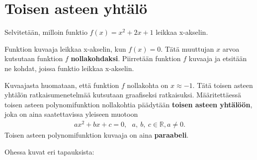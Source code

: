 \chapter{Toisen asteen yhtälö}
\begin{esimerkki}
Selvitetään, milloin funktio $f(x)=x^2+2x+1$ leikkaa x-akselin.

Funktion kuvaaja leikkaa x-akselin, kun $f(x)=0$. Tätä muuttujan $x$ arvoa kutsutaan funktion $f$ \textbf{nollakohdaksi}. Piirretään funktion $f$ kuvaaja ja etsitään ne kohdat, joissa funktio leikkaa x-akselin. %

\begin{kuvaajapohja}{1.5}{-2.5}{0.5}{-0.5}{3}
\end{kuvaajapohja}

\end{esimerkki}

Kuvaajasta huomataan, että funktion $f$ nollakohta on $x \approx -1$. Tätä toisen asteen yhtälön ratkaisumenetelmää kutsutaan graafiseksi ratkaisuksi.
Määritettäessä toisen asteen polynomifunktion nollakohtia päädytään \textbf{toisen asteen yhtälöön}, joka on aina saatettavissa yleiseen muotoon
\begin{align*}
ax^2+bx+c=0, \ \ \ a, \ b, \ c  \in \mathbb{R}, a \neq 0.
\end{align*}
Toisen asteen polynomifunktion kuvaaja on aina \textbf{paraabeli}. \\


Ohessa kuvat eri tapauksista:

